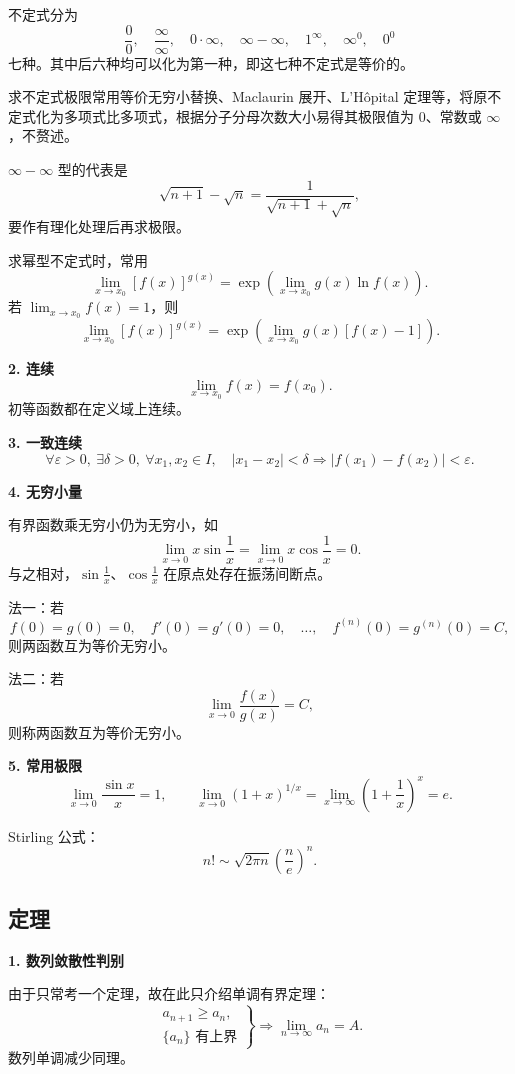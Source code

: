 \documentclass[UTF8,fontset=fandol,zihao=5]{ctexart}
\begin{document}
\begin{method}[求不定式极限值]
不定式分为
\[
\frac{0}{0},\quad\frac{\infty}{\infty},\quad
0\cdot\infty,\quad\infty-\infty,\quad
1^\infty,\quad\infty^0,\quad0^0
\]
七种。其中后六种均可以化为第一种，即这七种不定式是等价的。

求不定式极限常用等价无穷小替换、Maclaurin 展开、L'H\^{o}pital 定理等，将原不定式化为多项式比多项式，根据分子分母次数大小易得其极限值为 $0$、常数或 $\infty$，不赘述。

$\infty-\infty$ 型的代表是
\[
\sqrt{n+1}-\sqrt n
=\frac{1}{\sqrt{n+1}+\sqrt n},
\]
要作有理化处理后再求极限。

求幂型不定式时，常用
\[
\lim_{x\to x_0}[f(x)]^{g(x)}
=\exp\!\left(\lim_{x\to x_0}g(x)\ln f(x)\right).
\]
若 $\lim_{x\to x_0}f(x)=1$，则
\[
\lim_{x\to x_0}[f(x)]^{g(x)}
=\exp\!\left(\lim_{x\to x_0}g(x)[f(x)-1]\right).
\]
\end{method}

\textbf{2. 连续}
\[
\lim_{x\to x_0}f(x)=f(x_0).
\]
初等函数都在定义域上连续。

\textbf{3. 一致连续}
\[
\forall\varepsilon>0,\ \exists\delta>0,\
\forall x_1,x_2\in I,\quad
|x_1-x_2|<\delta\Longrightarrow|f(x_1)-f(x_2)|<\varepsilon.
\]

\textbf{4. 无穷小量}

有界函数乘无穷小仍为无穷小，如
\[
\lim_{x\to0}x\sin\frac1x
=\lim_{x\to0}x\cos\frac1x=0.
\]
与之相对，$\sin\frac1x$、$\cos\frac1x$ 在原点处存在振荡间断点。

\begin{method}[判断两函数在原点处是否为等价无穷小]
法一：若
\[
f(0)=g(0)=0,\quad f'(0)=g'(0)=0,\quad\ldots,\quad
f^{(n)}(0)=g^{(n)}(0)=C,
\]
则两函数互为等价无穷小。

法二：若
\[
\lim_{x\to0}\frac{f(x)}{g(x)}=C,
\]
则称两函数互为等价无穷小。
\end{method}

\textbf{5. 常用极限}
\[
\lim_{x\to0}\frac{\sin x}{x}=1,
\qquad
\lim_{x\to0}(1+x)^{1/x}
=\lim_{x\to\infty}\left(1+\frac1x\right)^x=e.
\]

Stirling 公式：
\[
n!\sim\sqrt{2\pi n}\left(\frac ne\right)^n.
\]

\subsection{定理}

\textbf{1. 数列敛散性判别}

由于只常考一个定理，故在此只介绍单调有界定理：
\[
\left.
\begin{array}{l}
a_{n+1}\geq a_n,\\
\{a_n\}\text{ 有上界}
\end{array}
\right\}
\Longrightarrow
\lim_{n\to\infty}a_n=A.
\]
数列单调减少同理。
\end{document}
